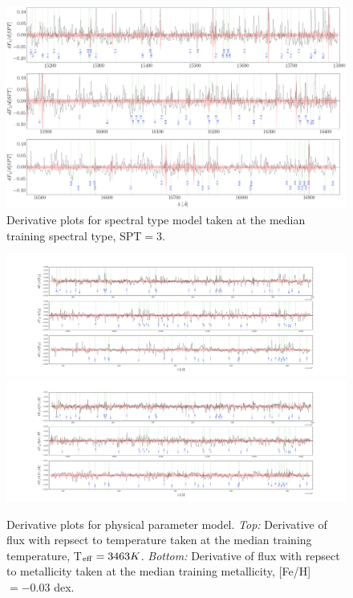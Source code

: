 \documentclass[modern]{aastex62}
\begin{document}
\begin{figure}[ht]
\begin{center}
\includegraphics[width=16cm]{figures/derivative_jackknife_spt.png}
\end{center}
\caption{Derivative plots for spectral type model taken at the median training spectral type, SPT$=3$.} \label{fig:west_derivative}
\end{figure}

\begin{figure}[ht]
\begin{center}
\includegraphics[width=16cm]{figures/derivative_jackknife_teff.png}
\includegraphics[width=16cm]{figures/derivative_jackknife_feh.png}
\end{center}
\caption{Derivative plots for physical parameter model. \textit{Top:} Derivative of flux with repsect to temperature taken at the median training temperature, T$_{\rm eff}=3463K$. \textit{Bottom:} Derivative of flux with repsect to metallicity taken at the median training metallicity, [Fe/H]$=-0.03$ dex.} \label{fig:mann_derivative}
\end{figure}
\end{document}
